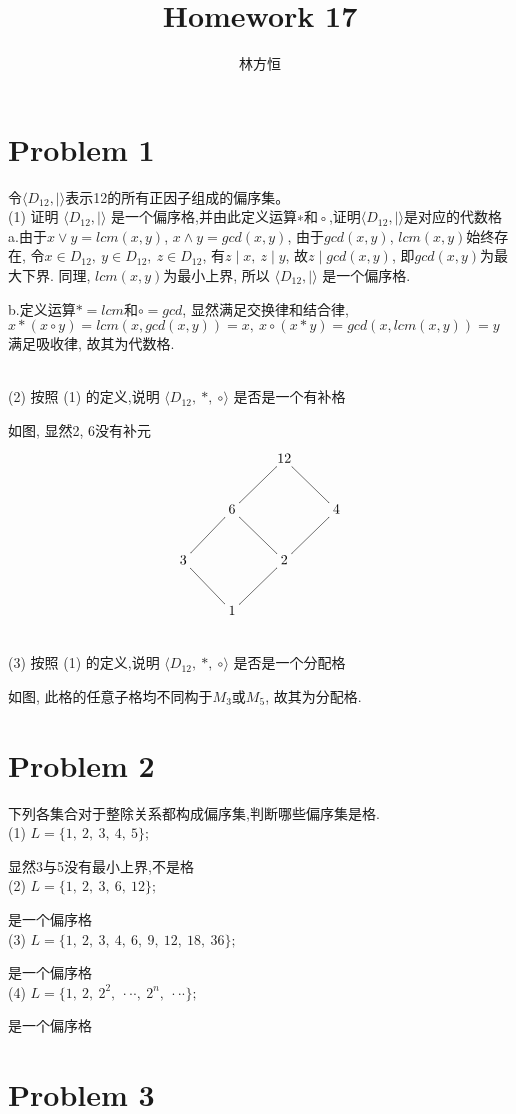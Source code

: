 \documentclass{article}
\title{\heiti\zihao{2} Homework 17}
\author{\songti 231275040 林方恒}
\begin{document}
	\maketitle
	\thispagestyle{empty}

\section{Problem 1}\par
令$\langle D_{12}, \mid \rangle$表示12的所有正因子组成的偏序集。\\
(1) 证明 $\langle D_{12}, \mid \rangle$ 是一个偏序格,并由此定义运算∗和◦,证明$\langle D_{12}, \mid \rangle$是对应的代数格\\

a.由于$x \vee y = lcm(x, y)$, $x \wedge y = gcd(x, y)$, 
由于$gcd(x, y)$, $lcm(x, y)$始终存在,
令$x \in D_{12},\ y \in D_{12},\ z \in D_{12}$, 
有$z \mid x,\ z \mid y $, 故$z \mid gcd(x, y)$, 即$gcd(x, y)$为最大下界.
同理, $lcm(x, y)$为最小上界, 所以 $\langle D_{12}, \mid \rangle$ 是一个偏序格.\par
b.定义运算$\ast = lcm$和$\circ = gcd$, 显然满足交换律和结合律, 
$ x \ast (x \circ y) = lcm(x, gcd(x, y)) = x,\ x \circ (x \ast y) = gcd(x, lcm(x, y)) = y$
满足吸收律, 故其为代数格.

~\\
(2) 按照 (1) 的定义,说明 $\langle D_{12},\ \ast,\ \circ \rangle$ 是否是一个有补格\par
如图, 显然2, 6没有补元
$$
\def\arl{\ar@{-}}
\xymatrix{
  &  &  12\arl[dl]\arl[dr]  &  \\
  &  6\arl[dl]\arl[dr] &  &4\arl[dl]\\
  3\arl[dr] & &2\arl[dl] & \\
  &1&&\\
}
$$

~\\
(3) 按照 (1) 的定义,说明 $\langle D_{12},\ \ast,\ \circ \rangle$ 是否是一个分配格

如图, 此格的任意子格均不同构于$M_3$或$M_5$, 故其为分配格.
\newpage
\section{Problem 2}\par
下列各集合对于整除关系都构成偏序集,判断哪些偏序集是格.\\
(1) $L = \{1,\ 2,\ 3,\ 4,\ 5\};$\par
显然3与5没有最小上界,不是格\\
(2) $L = \{1,\ 2,\ 3,\ 6,\ 12\};$\par
是一个偏序格\\
(3) $L = \{1,\ 2,\ 3,\ 4,\ 6,\ 9,\ 12,\ 18,\ 36\};$\par
是一个偏序格\\
(4) $L = \{1,\ 2,\ 2^2 ,\ · · · ,\ 2^n ,\ · · · \};$\par
是一个偏序格\\

\section{Problem 3}\par
\end{document}
